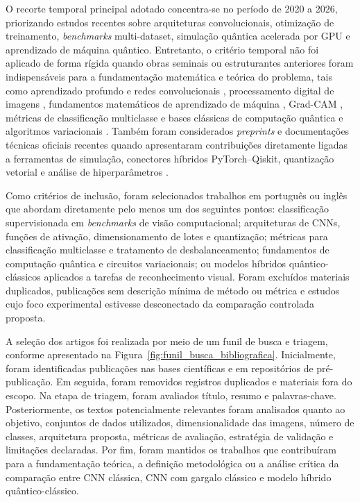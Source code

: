 \documentclass[
    12pt,
    openright,
    oneside,
    a4paper,
    english,
    brazil
]{abntex2}
\begin{document}
O recorte temporal principal adotado concentra-se no período de 2020 a 2026, priorizando estudos recentes sobre arquiteturas convolucionais, otimização de treinamento, \textit{benchmarks} multi-dataset, simulação quântica acelerada por GPU e aprendizado de máquina quântico. Entretanto, o critério temporal não foi aplicado de forma rígida quando obras seminais ou estruturantes anteriores foram indispensáveis para a fundamentação matemática e teórica do problema, tais como aprendizado profundo e redes convolucionais \cite{LeCun2015,goodfellow2016deep,szegedy2014going,he2016resnet}, processamento digital de imagens \cite{gonzalez2008digital}, fundamentos matemáticos de aprendizado de máquina \cite{deisenroth2020mathematics}, Grad-CAM \cite{selvaraju2020gradcam}, métricas de classificação multiclasse \cite{fawcett2006roc,hand2001simple} e bases clássicas de computação quântica e algoritmos variacionais \cite{nielsen2010quantum,biamonte2017qml,preskill2018nisq,mcclean2018barren,havlicek2019supervised}. Também foram considerados \textit{preprints} e documentações técnicas oficiais recentes quando apresentaram contribuições diretamente ligadas a ferramentas de simulação, conectores híbridos PyTorch--Qiskit, quantização vetorial e análise de hiperparâmetros \cite{egginger2024hyperparameter,zandieh2025turboquant,ibmQuantumAerSimulation2026,qiskitMachineLearningTorchConnector2026}.

Como critérios de inclusão, foram selecionados trabalhos em português ou inglês que abordam diretamente pelo menos um dos seguintes pontos: classificação supervisionada em \textit{benchmarks} de visão computacional; arquiteturas de CNNs, funções de ativação, dimensionamento de lotes e quantização; métricas para classificação multiclasse e tratamento de desbalanceamento; fundamentos de computação quântica e circuitos variacionais; ou modelos híbridos quântico-clássicos aplicados a tarefas de reconhecimento visual. Foram excluídos materiais duplicados, publicações sem descrição mínima de método ou métrica e estudos cujo foco experimental estivesse desconectado da comparação controlada proposta.

A seleção dos artigos foi realizada por meio de um funil de busca e triagem, conforme apresentado na Figura~\ref{fig:funil_busca_bibliografica}. Inicialmente, foram identificadas publicações nas bases científicas e em repositórios de pré-publicação. Em seguida, foram removidos registros duplicados e materiais fora do escopo. Na etapa de triagem, foram avaliados título, resumo e palavras-chave. Posteriormente, os textos potencialmente relevantes foram analisados quanto ao objetivo, conjuntos de dados utilizados, dimensionalidade das imagens, número de classes, arquitetura proposta, métricas de avaliação, estratégia de validação e limitações declaradas. Por fim, foram mantidos os trabalhos que contribuíram para a fundamentação teórica, a definição metodológica ou a análise crítica da comparação entre CNN clássica, CNN com gargalo clássico e modelo híbrido quântico-clássico.
\end{document}
